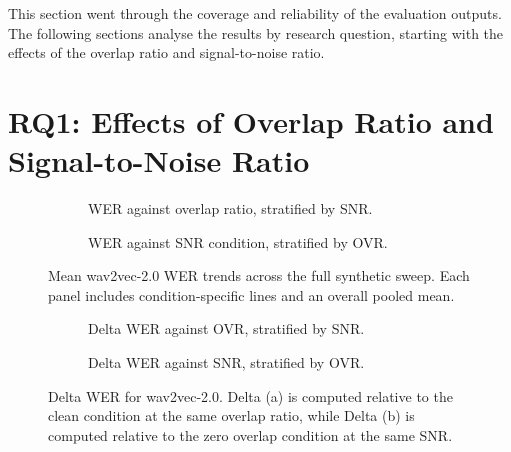 This section went through the coverage and reliability of the evaluation outputs. The following sections analyse the results by research question, starting with the effects of the overlap ratio and signal-to-noise ratio.

\section{RQ1: Effects of Overlap Ratio and Signal-to-Noise Ratio}
\label{sec:rq1_analysis}

\begin{figure}[htbp]
    \centering
    \begin{subfigure}[t]{0.49\linewidth}
        \centering
        \caption{WER against overlap ratio, stratified by SNR.}
        \label{fig:stat_wav2vec2_wer_vs_ovr}
    \end{subfigure}
    \hfill
    \begin{subfigure}[t]{0.49\linewidth}
        \centering
        \caption{WER against SNR condition, stratified by OVR.}
        \label{fig:stat_wav2vec2_wer_vs_snr}
    \end{subfigure}
    \caption{Mean wav2vec-2.0 WER trends across the full synthetic sweep. Each panel includes condition-specific lines and an overall pooled mean.}
    \label{fig:stat_wav2vec2_wer_trends}
\end{figure}



\begin{figure}[htbp]
    \centering
    \begin{subfigure}[t]{0.49\linewidth}
        \centering
        \caption{Delta WER against OVR, stratified by SNR.}
        \label{fig:stat_wav2vec2_delta_vs_ovr_panel}
    \end{subfigure}
    \hfill
    \begin{subfigure}[t]{0.49\linewidth}
        \centering
        \caption{Delta WER against SNR, stratified by OVR.}
        \label{fig:stat_wav2vec2_delta_vs_snr_panel}
    \end{subfigure}
    \caption{Delta WER for wav2vec-2.0. Delta (a) is computed relative to the clean condition at the same overlap ratio, while Delta (b) is computed relative to the zero overlap condition at the same SNR.}
    \label{fig:stat_wav2vec2_delta_vs_ovr}
\end{figure}

